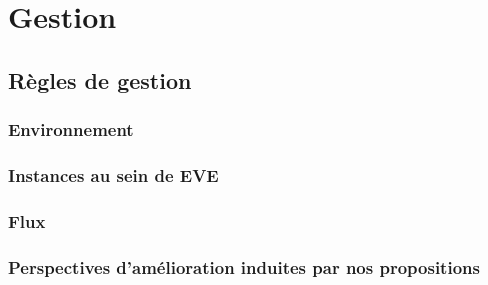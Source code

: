 \section{Gestion}
\subsection{Règles de gestion}
\subsubsection{Environnement}
\subsubsection{Instances au sein de EVE}
\subsubsection{Flux}
\subsubsection{Perspectives d'amélioration induites par nos propositions}